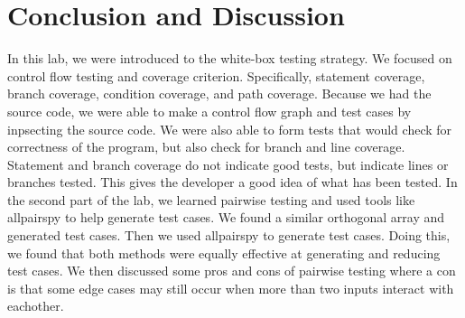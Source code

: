 \documentclass[12pt, letterpaper, titlepage]{article}
\begin{document}
\section{Conclusion and Discussion}
In this lab, we were introduced to the white-box testing strategy. We focused on control flow testing and coverage criterion. Specifically, statement coverage, branch coverage, condition coverage, and path coverage. Because we had the source code, we were able to make a control flow graph and test cases by inpsecting the source code. We were also able to form tests that would check for correctness of the program, but also check for branch and line coverage. Statement and branch coverage do not indicate good tests, but indicate lines or branches tested. This gives the developer a good idea of what has been tested. In the second part of the lab, we learned pairwise testing and used tools like allpairspy to help generate test cases. We found a similar orthogonal array and generated test cases. Then we used allpairspy to generate test cases. Doing this, we found that both methods were equally effective at generating and reducing test cases. We then discussed some pros and cons of pairwise testing where a con is that some edge cases may still occur when more than two inputs interact with eachother.
\end{document}
